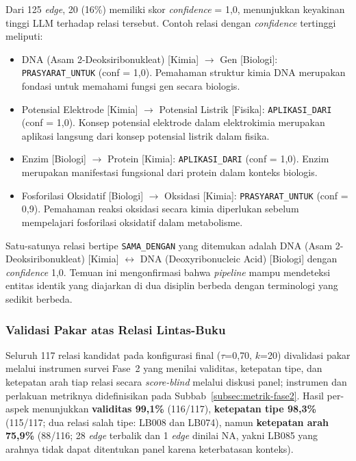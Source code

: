 \documentclass[main]{subfiles}
\begin{document}
Dari 125 \textit{edge}, 20 (16\%) memiliki skor \textit{confidence} = 1{,}0, menunjukkan
keyakinan tinggi LLM terhadap relasi tersebut. Contoh relasi dengan
\textit{confidence} tertinggi meliputi:

\begin{itemize}
  \item DNA (Asam 2-Deoksiribonukleat) [Kimia] $\to$ Gen [Biologi]:
    \texttt{PRASYARAT\_UNTUK} (conf = 1{,}0). Pemahaman struktur kimia DNA merupakan
    fondasi untuk memahami fungsi gen secara biologis.
  \item Potensial Elektrode [Kimia] $\to$ Potensial Listrik [Fisika]:
    \texttt{APLIKASI\_DARI} (conf = 1{,}0). Konsep potensial elektrode dalam
    elektrokimia merupakan aplikasi langsung dari konsep potensial listrik
    dalam fisika.
  \item Enzim [Biologi] $\to$ Protein [Kimia]: \texttt{APLIKASI\_DARI} (conf = 1{,}0).
    Enzim merupakan manifestasi fungsional dari protein dalam konteks biologis.
  \item Fosforilasi Oksidatif [Biologi] $\to$ Oksidasi [Kimia]:
    \texttt{PRASYARAT\_UNTUK} (conf = 0{,}9). Pemahaman reaksi oksidasi secara kimia
    diperlukan sebelum mempelajari fosforilasi oksidatif dalam metabolisme.
\end{itemize}

Satu-satunya relasi bertipe \texttt{SAMA\_DENGAN} yang ditemukan adalah DNA (Asam
2-Deoksiribonukleat) [Kimia] $\leftrightarrow$ DNA (Deoxyribonucleic Acid)
[Biologi] dengan \textit{confidence} 1{,}0. Temuan ini mengonfirmasi bahwa
\textit{pipeline} mampu mendeteksi entitas identik yang diajarkan di dua disiplin
berbeda dengan terminologi yang sedikit berbeda.

\subsubsection{Validasi Pakar atas Relasi Lintas-Buku}

Seluruh 117 relasi kandidat pada konfigurasi final ($\tau$=0{,}70, $k$=20)
divalidasi pakar melalui instrumen survei Fase~2 yang menilai validitas,
ketepatan tipe, dan ketepatan arah tiap relasi secara \textit{score-blind}
melalui diskusi panel; instrumen dan perlakuan metriknya didefinisikan pada
Subbab~\ref{subsec:metrik-fase2}. Hasil per-aspek menunjukkan
\textbf{validitas 99{,}1\%} (116/117), \textbf{ketepatan tipe 98{,}3\%}
(115/117; dua relasi salah tipe: LB008 dan LB074), namun \textbf{ketepatan
arah 75{,}9\%} (88/116; 28 \textit{edge} terbalik dan 1 \textit{edge} dinilai
NA, yakni LB085 yang arahnya tidak dapat ditentukan panel karena keterbatasan
konteks).
\end{document}
